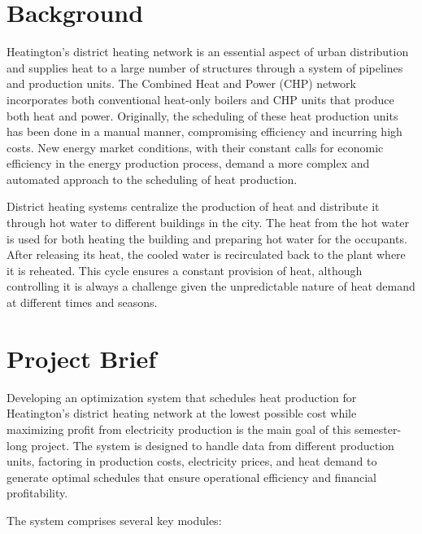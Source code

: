 \documentclass[12pt]{report}
\begin{document}
\section{Background}
Heatington’s district heating network is an essential aspect of urban distribution and supplies heat to a large number of structures through a system of pipelines and production units. The Combined Heat and Power (CHP) network incorporates both conventional heat-only boilers and CHP units that produce both heat and power. Originally, the scheduling of these heat production units has been done in a manual manner, compromising efficiency and incurring high costs. New energy market conditions, with their constant calls for economic efficiency in the energy production process, demand a more complex and automated approach to the scheduling of heat production.

District heating systems centralize the production of heat and distribute it through hot water to different buildings in the city. The heat from the hot water is used for both heating the building and preparing hot water for the occupants. After releasing its heat, the cooled water is recirculated back to the plant where it is reheated. This cycle ensures a constant provision of heat, although controlling it is always a challenge given the unpredictable nature of heat demand at different times and seasons.

\section{Project Brief}
Developing an optimization system that schedules heat production for Heatington’s district heating network at the lowest possible cost while maximizing profit from electricity production is the main goal of this semester-long project. The system is designed to handle data from different production units, factoring in production costs, electricity prices, and heat demand to generate optimal schedules that ensure operational efficiency and financial profitability.

The system comprises several key modules:
\end{document}
